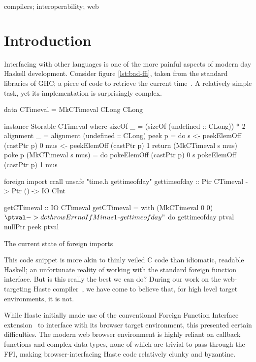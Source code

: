 \documentclass[preprint]{sigplanconf}
\begin{document}
%
\keywords
compilers; interoperability; web

\section{Introduction}\label{sec:intro}
Interfacing with other languages is one of the more painful aspects of modern
day Haskell development. Consider figure \ref{lst:bad-ffi}, taken from the
standard libraries of GHC; a piece of code to retrieve the
current time\ \cite{time}. A relatively simple task, yet its implementation is
surprisingly complex.

\begin{listingfloat}
\begin{code}
data CTimeval = MkCTimeval CLong CLong

instance Storable CTimeval where
	sizeOf _ = (sizeOf (undefined :: CLong)) * 2
	alignment _ = alignment (undefined :: CLong)
	peek p = do
		s   <- peekElemOff (castPtr p) 0
		mus <- peekElemOff (castPtr p) 1
		return (MkCTimeval s mus)
	poke p (MkCTimeval s mus) = do
		pokeElemOff (castPtr p) 0 s
		pokeElemOff (castPtr p) 1 mus

foreign import ccall unsafe "time.h gettimeofday"
   gettimeofday :: Ptr CTimeval -> Ptr () -> IO CInt

getCTimeval :: IO CTimeval
getCTimeval = with (MkCTimeval 0 0) $ \ptval -> do
  throwErrnoIfMinus1_ "gettimeofday" $ do
    gettimeofday ptval nullPtr
  peek ptval
\end{code}
\caption{The current state of foreign imports}
\label{lst:bad-ffi}
\end{listingfloat}

This code snippet is more akin to thinly veiled C code than idiomatic, readable
Haskell; an unfortunate reality of working with the standard foreign function
interface. But is this really the best we can do?
During our work on the web-targeting Haste compiler\ \cite{haste}, we have
come to believe that, for high level target environments, it is not.

While Haste initially made use of the conventional Foreign Function Interface
extension\ \cite{ffi} to interface with its browser target environment,
this presented certain difficulties.
The modern web browser environment is highly reliant on callback functions and
complex data types, none of which are trivial to pass through the FFI,
making browser-interfacing Haste code relatively clunky and byzantine.
\end{document}
